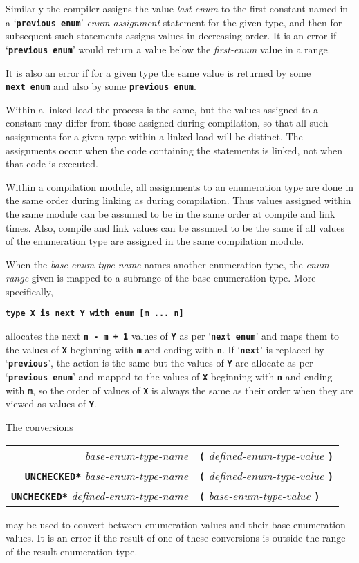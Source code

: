 \documentclass[12pt]{article}
\newcommand{\TT}[1]{{\tt \bfseries #1}}
\begin{document}
Similarly the compiler assigns the value {\em last-enum}
to the first constant named in a `\TT{previous enum}'
{\em enum-assignment} statement for
the given type, and then for subsequent such statements
assigns values in decreasing order.
It is an error if `\TT{previous~enum}'
would return a value below the {\em first-enum} value in a range.

It is also an error if for a given type the same value is returned
by some \TT{next~enum} and also by some \TT{previous~enum}.

Within a linked load the process is the same, but the values assigned
to a constant may differ from those assigned during compilation,
so that all such assignments for a given type within a linked load
will be distinct.  The assignments occur when the code containing
the statements is linked, not when that code is executed.

Within a compilation module, all assignments to an enumeration type
are done in the same order during linking as during compilation.
Thus values assigned within the same module can be assumed to be
in the same order at compile and link times.  Also,
compile and link values
can be assumed to be the same if all values of the enumeration type
are assigned in the same compilation module.

When the {\em base-enum-type-name} names another enumeration type,
the {\em enum-range} given is mapped to a subrange of the
base enumeration type.  More specifically,
\begin{center}
\TT{type X is next Y with enum [m~...~n]}
\end{center}
allocates
the next \TT{n - m + 1} values of \TT{Y} as per `\TT{next enum}'
and maps them to the values
of \TT{X} beginning with \TT{m} and ending with \TT{n}.
If `\TT{next}' is replaced by `\TT{previous}', the action is the
same but the values of \TT{Y} are allocate as per `\TT{previous enum}'
and mapped to the values
of \TT{X} beginning with \TT{n} and ending with \TT{m}, so the order
of values of \TT{X} is always the same as their order when they
are viewed as values of \TT{Y}.

The conversions
\begin{center}
\begin{tabular}{rl}
{\em base-enum-type-name}
	& \TT{(} {\em defined-enum-type-value} \TT{)} \\
\TT{*UNCHECKED*} {\em base-enum-type-name}
	& \TT{(} {\em defined-enum-type-value} \TT{)} \\
\TT{*UNCHECKED*} {\em defined-enum-type-name}
	& \TT{(} {\em base-enum-type-value} \TT{)} \\
\end{tabular}
\end{center}
may be used to convert between enumeration values and their base enumeration
values.
It is an error if the result of one of these conversions is outside
the range of the result enumeration type.
\end{document}
